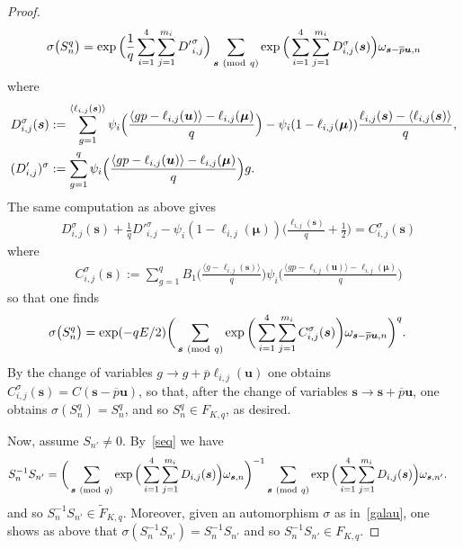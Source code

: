 \documentclass[11pt]{amsart}
\newcommand{\ang}[1]{\langle#1\rangle}
\renewcommand{\mod}[1]{~\pr{\textnormal{mod}~#1}}
\theoremstyle{definition}
\newcommand{\pr}[1]{\mathchoice{\left( #1\right)}{(#1)}{(#1)}{(#1)}}
\newcommand{\bu}{\boldsymbol{u}}
\newcommand{\bs}{\boldsymbol }
\newcommand{\1}{{\mathbf 1}}
\renewcommand{\bar}[1]{\overline{#1}}
\let\originalleft\left
\let\originalright\right
\renewcommand{\left}{\mathopen{}\mathclose\bgroup\originalleft}
\renewcommand{\right}{\aftergroup\egroup\originalright}
\numberwithin{equation}{section}
\begin{document}
\begin{proof}
  \begin{align*}
    \sigma\big(S_n^q\big)&=\exp\Big(\frac1q\sum_{i=1}^4\sum_{j=1}^{m_i}{D'}^\sigma_{i,j}\Big)\sum_{\bs s\mod q}\exp\Big(\sum_{i=1}^4\sum_{j=1}^{m_i}D^\sigma_{i,j}(\bs s)\Big)\omega_{\bs s-\bar p \bs u,n}\\
  \end{align*}
  where
  \begin{align}
    D^\sigma_{i,j}(\bs s)&:=\sum_{g=1}^{\ang{\ell_{i,j}(\bs s)}} \psi_i\Big(\frac{\ang{gp -\ell_{i,j}(\bs u) } -\ell_{i,j}(\bs\mu)}q\Big)- \psi_i(1 -\ell_{i,j}(\bs\mu))\frac{\ell_{i,j}(\bs s)- \ang{\ell_{i,j}(\bs s)}}q,\label{defdp}\\
    (D'_{i,j})^\sigma&:=\sum_{g=1}^{q} \psi_i\Big(\frac{\ang{gp -\ell_{i,j}(\bs u) } -\ell_{i,j}(\bs\mu)}q\Big)g.\notag
  \end{align}
  The same computation as above gives
  \begin{align}\label{udav}
    &D^\sigma_{i,j}(\bs s)+\frac1q{{D'}^\sigma_{i,j}}- \psi_i(1 -\ell_{i,j}(\bs\mu))\Big(\frac{  \ell_{i,j}(\bs s)}q+\frac12\Big)=C^\sigma_{i,j}(\bs s)
  \end{align}
  where 
  \begin{align}
    &C^\sigma_{i,j}(\bs s):=\sum_{g=1}^{q}B_1\Big(\frac{\ang{g-\ell_{i,j}(\bs s)}}q\Big) \psi_i\Big(\frac{\ang{gp -\ell_{i,j}(\bs u)} -\ell_{i,j}(\bs\mu)}q\Big)
  \end{align}
  so that one finds 
  \begin{align*}
    \sigma\big(S_n^q\big)&=\exp(- q E/2)\bigg(\sum_{\bs s\mod q}\exp\bigg(\sum_{i=1}^4\sum_{j=1}^{m_i}C^\sigma_{i,j}(\bs s)\bigg)\omega_{\bs s-\bar p \bs u,n}\bigg)^q.
  \end{align*}
  By the change of variables $g\to g+\overline p\ell_{i,j}(\bs u)$ one obtains $C^\sigma_{i,j}(\bs s)=C(\bs s-\overline p\bs u)$, so that, after the change of variables $\bs s\to \bs s+\overline p \bu$, one obtains $\sigma(S_n^q)=S_n^q$, and so $S_n^q \in F_{K, q}$, as desired.

  Now, assume $S_{n'}\neq0$. By~\eqref{seq} we have
  \begin{align*}
    S_n^{-1}S_{n'}&=\bigg(\sum_{\bs s\mod q} \exp\Big(\sum_{i=1}^4\sum_{j=1}^{m_i}D_{i,j}(\bs s)\Big)\omega_{\bs s,n}\bigg)^{-1} \sum_{\bs s\mod q} \exp\Big(\sum_{i=1}^4\sum_{j=1}^{m_i}D_{i,j}(\bs s)\Big)\omega_{\bs s,n'}. 
  \end{align*}
  and so $S_n^{-1}S_{n'}\in {\tilde F}_{K, q}$. Moreover, given an automorphism $\sigma$ as in~\eqref{galau}, one shows as above that $\sigma(S_n^{-1}S_{n'})=S_n^{-1}S_{n'}$ and so $S_n^{-1}S_{n'}\in F_{K, q}$.
\end{proof}
\end{document}
